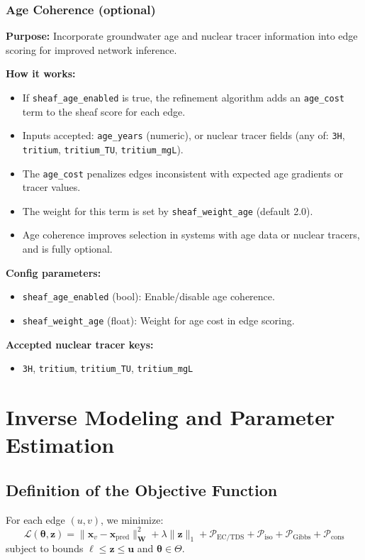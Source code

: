 \documentclass[12pt,a4paper]{article}
\theoremstyle{plain}
\theoremstyle{definition}
\theoremstyle{remark}
\begin{document}
\subsubsection{Age Coherence (optional)}
\label{sec:age_coherence}

\textbf{Purpose:} Incorporate groundwater age and nuclear tracer information into edge scoring for improved network inference.

\textbf{How it works:}
\begin{itemize}
	\item If \texttt{sheaf\_age\_enabled} is true, the refinement algorithm adds an \texttt{age\_cost} term to the sheaf score for each edge.
	\item Inputs accepted: \texttt{age\_years} (numeric), or nuclear tracer fields (any of: \texttt{3H}, \texttt{tritium}, \texttt{tritium\_TU}, \texttt{tritium\_mgL}).
	\item The \texttt{age\_cost} penalizes edges inconsistent with expected age gradients or tracer values.
	\item The weight for this term is set by \texttt{sheaf\_weight\_age} (default 2.0).
	\item Age coherence improves selection in systems with age data or nuclear tracers, and is fully optional.
\end{itemize}

\textbf{Config parameters:}
\begin{itemize}
	\item \texttt{sheaf\_age\_enabled} (bool): Enable/disable age coherence.
	\item \texttt{sheaf\_weight\_age} (float): Weight for age cost in edge scoring.
\end{itemize}

\textbf{Accepted nuclear tracer keys:}
\begin{itemize}
	\item \texttt{3H}, \texttt{tritium}, \texttt{tritium\_TU}, \texttt{tritium\_mgL}
\end{itemize}


\section{Inverse Modeling and Parameter Estimation}\label{sec:calibration}

\subsection{Definition of the Objective Function}\label{sec:objective_function}
For each edge $(u,v)$, we minimize:
\begin{equation}\label{eq:master_problem}
	\mathcal{L}(\boldsymbol{\theta}, \mathbf{z}) = \|\mathbf{x}_v - \mathbf{x}_{\text{pred}}\|_{\mathbf{W}}^2 + \lambda \|\mathbf{z}\|_1 + \mathcal{P}_{\text{EC/TDS}} + \mathcal{P}_{\text{iso}} + \mathcal{P}_{\text{Gibbs}} + \mathcal{P}_{\text{cons}}
\end{equation}
subject to bounds $\boldsymbol{\ell} \leq \mathbf{z} \leq \mathbf{u}$ and $\boldsymbol{\theta} \in \Theta$.
\end{document}
